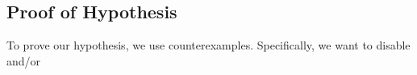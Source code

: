 \subsection{Proof of Hypothesis}
To prove our hypothesis, we use counterexamples. Specifically, we want to disable and/or 